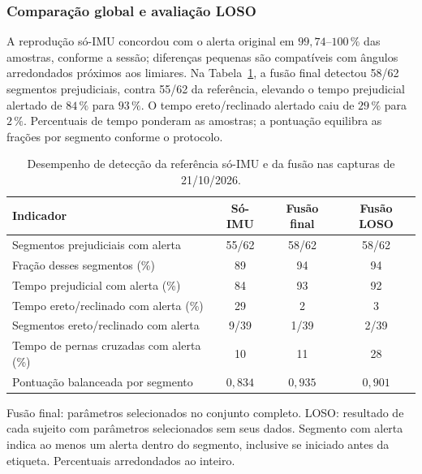 \subsubsection{Comparação global e avaliação LOSO}

A reprodução só-IMU concordou com o alerta original em
$99{,}74$--$100\,\%$ das amostras, conforme a sessão; diferenças pequenas
são compatíveis com ângulos arredondados próximos aos limiares.
Na Tabela~\ref{tab:res-comparacao}, a fusão final detectou 58/62 segmentos
prejudiciais, contra 55/62 da referência, elevando o tempo prejudicial
alertado de $84\,\%$ para $93\,\%$. O tempo ereto/reclinado alertado caiu de
$29\,\%$ para $2\,\%$. Percentuais de tempo ponderam as amostras;
a pontuação equilibra as frações por segmento conforme o protocolo.

\begin{table}[H]
  \centering
  \caption{Desempenho de detecção da referência só-IMU e da fusão nas capturas
  de 21/10/2026.}
  \label{tab:res-comparacao}
  \begin{singlespace}
  \small
  \begin{tabularx}{\linewidth}{Xccc}
    \toprule
    Indicador & Só-IMU & Fusão final & Fusão LOSO \\
    \midrule
    Segmentos prejudiciais com alerta & 55/62 & 58/62 & 58/62 \\
    Fração desses segmentos (\%) & 89 & 94 & 94 \\
    Tempo prejudicial com alerta (\%) & 84 & 93 & 92 \\
    Tempo ereto/reclinado com alerta (\%) & 29 & 2 & 3 \\
    Segmentos ereto/reclinado com alerta & 9/39 & 1/39 & 2/39 \\
    Tempo de pernas cruzadas com alerta (\%) & 10 & 11 & 28 \\
    Pontuação balanceada por segmento & $0{,}834$ & $0{,}935$ & $0{,}901$ \\
    \bottomrule
  \end{tabularx}
  \end{singlespace}
  \par\smallskip
  {\footnotesize Fusão final: parâmetros selecionados no conjunto completo.
  LOSO: resultado de cada sujeito com parâmetros selecionados sem seus dados.
  Segmento com alerta indica ao menos um alerta dentro do segmento, inclusive
  se iniciado antes da etiqueta. Percentuais arredondados ao inteiro.}
\end{table}

